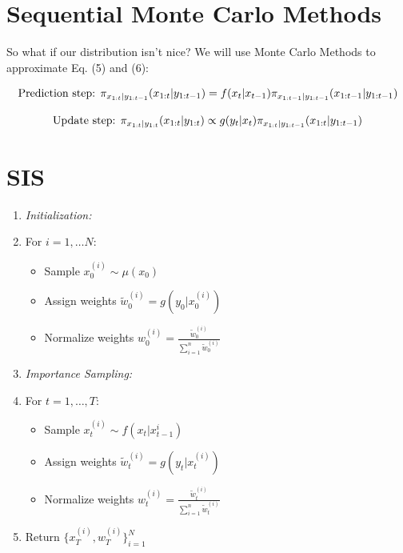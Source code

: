 \documentclass{article}
\begin{document}
\section{Sequential Monte Carlo Methods}

So what if our distribution isn't nice? We will use Monte Carlo Methods to approximate Eq. (5) and (6):

\begin{equation}
\textnormal{Prediction step:  }
\pi_{x_{1:t}|y_{1:t-1}}(x_{1:t}|y_{1:t-1})= f(x_t|x_{t-1}) \pi_{x_{1:t-1}|y_{1:t-1}}(x_{1:t-1}|y_{1:t-1})
\end{equation}

\begin{equation}
\textnormal{Update step:  }
\pi_{x_{1:t}|y_{1:t}}(x_{1:t}|y_{1:t})\propto g(y_t|x_t)\pi_{x_{1:t}|y_{1:t-1}}(x_{1:t}|y_{1:t-1})
\end{equation}

\section{SIS}

\begin{enumerate}
\item \textit{Initialization:}
\item[] For $i=1,\dots N$:
\begin{itemize}
\item[] Sample $x_0^{(i)} \sim \mu(x_0)$
\item[] Assign weights $\widetilde{w}_0^{(i)} = g(y_0|x_0^{(i)})$
\item[] Normalize weights $w_0^{(i)} = \frac{\widetilde{w}_0^{(i)}}{\sum_{i=1}^{n} \widetilde{w}_0^{(i)}}$
\end{itemize}
\item \textit{Importance Sampling:}
\item[] For $t=1,\dots,T$:
\begin{itemize}
\item[] Sample $x_t^{(i)} \sim f(x_t|x_{t-1}^{i})$
\item[] Assign weights $\widetilde{w}_t^{(i)} = g(y_t|x_t^{(i)})$
\item[] Normalize weights $w_t^{(i)} = \frac{\widetilde{w}_t^{(i)}}{\sum_{i=1}^{n} \widetilde{w}_t^{(i)}}$
\end{itemize}
\item Return $\{x_T^{(i)},w_T^{(i)}\}_{i=1}^N$
\end{enumerate}
\end{document}

